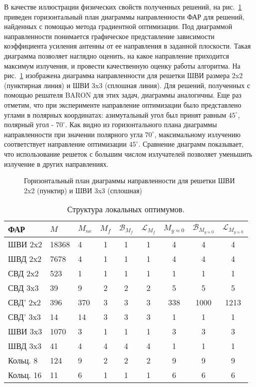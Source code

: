 В качестве иллюстрации физических свойств полученных решений, на рис.~\ref{ris:bve_comp} приведен горизонтальный план диаграммы направленности ФАР для решений, найденных с помощью метода градиентной оптимизации. Под диаграммой направленности понимается графическое представление зависимости коэффициента усиления антенны от ее направления в заданной плоскости. Такая диаграмма позволяет наглядно оценить, на какое направление приходится максимум излучения, и провести качественную оценку работы алгоритма. На рис.~\ref{ris:bve_comp} изображена диаграмма направленности для решетки ШВИ размера 2x2 (пунктирная линия) и ШВИ 3x3 (сплошная линия). Для решений, полученных с помощью решателя BARON для этих задач, диаграммы аналогичны. Еще раз отметим, что при эксперименте направление оптимизации было представлено углами в полярных координатах: азимутальный угол был принят равным $45^{\circ}$, полярный угол - $70^{\circ}$. Как видно из горизонтального плана диаграммы направленности при значении полярного угла $70^{\circ}$, максимальному излучению соответствует направление оптимизации $45^{\circ}$. Сравнение диаграмм показывает, что использование решеток с большим числом излучателей позволяет уменьшить излучение в других направлениях.

\begin{figure}[h]
    \centering
    \vspace{0.7em}
    \caption{Горизонтальный план диаграммы направленности для решетки ШВИ 2x2 (пунктир) и ШВИ 3x3 (сплошная)}
    \label{ris:bve_comp}
\end{figure}

\begin{table}[!h]
\centering
\begin{tabular}{|l | l l | c c c | c c c|}
    \hline
    \textbf{ФАР} & \textbf{$M$} & \textbf{$M_{ne}$} & \textbf{$M_{f}$} & \textbf{$\mathcal{B}_{M_f}$} & \textbf{$\mathcal{L}_{M_f}$} & \textbf{$M_{y\approx0}$} & \textbf{$\mathcal{B}_{M_{y\approx0}}$} & \textbf{$\mathcal{L}_{M_{y\approx0}}$}\\
    \hline
    ШВИ 2x2 & 18368 & 4 & 1 & 1 & 1 & 4 & 4 & 4\\
    ШВД 2x2 & 7678  & 4 & 1 & 1 & 1 & 4 & 4 & 4\\
    СВД 2x2  & 523  & 1 & 1 & 1 & 1 & 1 & 1 & 1\\
    СВД 3x3  & 39  & 9 & 2 & 2 & 2 & 5 & 5 & 5\\
    СВД' 2x2  & 396  & 370 & 3 & 3 & 3 & 338 & 1000 & 1213\\
    СВД' 3x3  & 14  & 14 & 3 & 3 & 3 & 1 & 1 & 1\\
    ШВИ 3x3 & 1070  & 3 & 1 & 1 & 1 & 3 & 3 & 3 \\
    ШВД 3x3 & 41  & 4 & 4 & 4 & 4 & 1 & 1 & 1 \\
    Кольц. 8 & 124  & 9 & 2 & 2 & 2 & 9 & 9 & 9\\
    Кольц. 16 & 11  & 6 & 1 & 1 & 1& 6 & 6 & 6\\
    \hline
\end{tabular}
    \caption{Структура локальных оптимумов.}
    \label{tab:structure}
\end{table}

